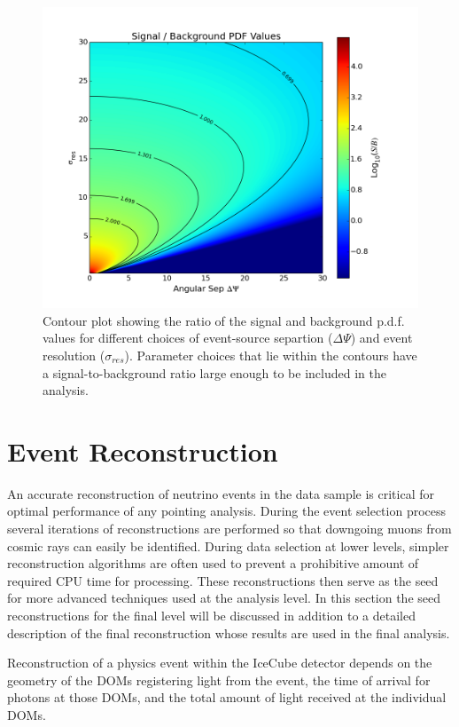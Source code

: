 \documentclass{gatech-thesis}
\begin{document}
\begin{figure}[ht]
  \begin{center}
    \includegraphics[width=.65\textwidth,keepaspectratio]{SignalOverBackground_ContourMap.png}
  \end{center}
  \caption{Contour plot showing the ratio of the signal and background p.d.f. values for different choices of event-source separtion ($\Delta \Psi$) and event resolution ($\sigma_{res}$). Parameter choices that lie within the contours have a signal-to-background ratio large enough to be included in the analysis.}
  \label{fig:QualityCutParameterSpace}
\end{figure}

\section{Event Reconstruction}
An accurate reconstruction of neutrino events in the data sample is critical for optimal performance of any pointing analysis. During the event selection process several iterations of reconstructions are performed so that downgoing muons from cosmic rays can easily be identified. During data selection at lower levels, simpler reconstruction algorithms are often used to prevent a prohibitive amount of required CPU time for processing. These reconstructions then serve as the seed for more advanced techniques used at the analysis level. In this section the seed reconstructions for the final level will be discussed in addition to a detailed description of the final reconstruction whose results are used in the final analysis.

Reconstruction of a physics event within the IceCube detector depends on the geometry of the DOMs registering light from the event, the time of arrival for photons at those DOMs, and the total amount of light received at the individual DOMs.
\end{document}
